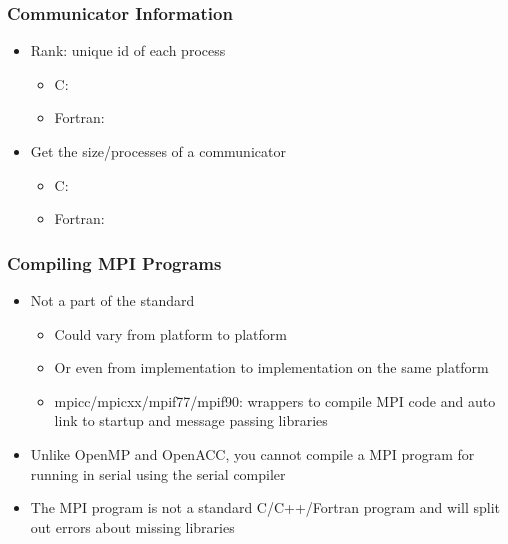 \documentclass[10pt,t]{beamer}
\begin{document}
\begin{frame}[fragile]
  \frametitle{Communicator Information}
  \begin{itemize}
  \item Rank: unique id of each process
    \begin{itemize}
    \item \textcolor{lubrown}{C:} 
    \item \textcolor{lubrown}{Fortran:} 
    \end{itemize}
  \item Get the size/processes of a communicator
    \begin{itemize}
    \item \textcolor{lubrown}{C:} 
    \item \textcolor{lubrown}{Fortran:} 
    \end{itemize}
  \end{itemize}
\end{frame}

\begin{frame}
  \frametitle{Compiling MPI Programs}
  \begin{itemize}
    \item Not a part of the standard
      \begin{itemize}
        \item Could vary from platform to platform
        \item Or even from implementation to implementation on the same  platform
        \item mpicc/mpicxx/mpif77/mpif90: wrappers to compile MPI code and auto 
          link to startup and message passing libraries 
      \end{itemize}
    \item<2> \alert<2>{Unlike OpenMP and OpenACC, you cannot compile a MPI program 
      for running in serial using the serial compiler}
    \item<2> \alert<2>{The MPI program is not a standard C/C++/Fortran program and 
      will split out errors about missing libraries} 
  \end{itemize}
\end{frame}
\end{document}
